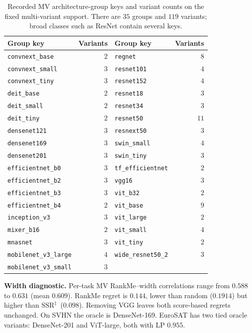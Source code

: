 \documentclass{article}
\newcommand{\SSRdag}{\ensuremath{\mathrm{SSR}^{\ddagger}}\xspace}
\begin{document}
\begin{table}[h]
\centering\small
\caption{Recorded MV architecture-group keys and variant counts on the fixed multi-variant support. There are $35$ groups and $119$ variants; broad classes such as ResNet contain several keys.}
\label{tab:mv_families}
\begin{tabular}{lrlr}
\toprule
Group key & Variants & Group key & Variants \\
\midrule
\texttt{convnext\_base} & $2$ & \texttt{regnet} & $8$ \\
\texttt{convnext\_small} & $3$ & \texttt{resnet101} & $4$ \\
\texttt{convnext\_tiny} & $3$ & \texttt{resnet152} & $4$ \\
\texttt{deit\_base} & $2$ & \texttt{resnet18} & $3$ \\
\texttt{deit\_small} & $2$ & \texttt{resnet34} & $3$ \\
\texttt{deit\_tiny} & $2$ & \texttt{resnet50} & $11$ \\
\texttt{densenet121} & $3$ & \texttt{resnext50} & $3$ \\
\texttt{densenet169} & $3$ & \texttt{swin\_small} & $4$ \\
\texttt{densenet201} & $3$ & \texttt{swin\_tiny} & $3$ \\
\texttt{efficientnet\_b0} & $3$ & \texttt{tf\_efficientnet} & $2$ \\
\texttt{efficientnet\_b2} & $3$ & \texttt{vgg16} & $3$ \\
\texttt{efficientnet\_b3} & $3$ & \texttt{vit\_b32} & $2$ \\
\texttt{efficientnet\_b4} & $2$ & \texttt{vit\_base} & $9$ \\
\texttt{inception\_v3} & $3$ & \texttt{vit\_large} & $2$ \\
\texttt{mixer\_b16} & $2$ & \texttt{vit\_small} & $4$ \\
\texttt{mnasnet} & $3$ & \texttt{vit\_tiny} & $2$ \\
\texttt{mobilenet\_v3\_large} & $4$ & \texttt{wide\_resnet50\_2} & $3$ \\
\texttt{mobilenet\_v3\_small} & $3$ &  &  \\
\bottomrule
\end{tabular}
\end{table}

\textbf{Width diagnostic.} Per-task MV RankMe--width correlations range from $0.588$ to $0.631$ (mean $0.609$). RankMe regret is $0.144$, lower than random ($0.1914$) but higher than \SSRdag\ ($0.098$). Removing VGG leaves both score-based regrets unchanged. On SVHN the oracle is DenseNet-169. EuroSAT has two tied oracle variants: DenseNet-201 and ViT-large, both with LP $0.955$.
\end{document}
